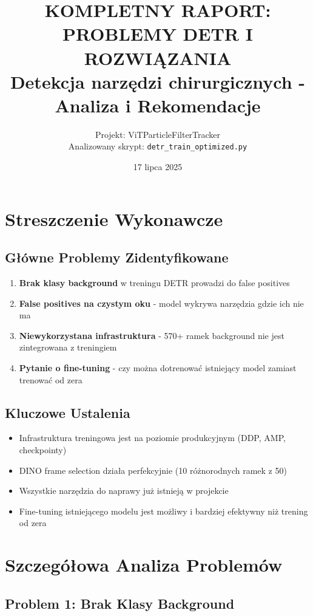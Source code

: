 \documentclass[12pt,a4paper]{article}
\title{\textbf{KOMPLETNY RAPORT: PROBLEMY DETR I ROZWIĄZANIA}\\
\Large Detekcja narzędzi chirurgicznych - Analiza i Rekomendacje}
\author{Projekt: ViTParticleFilterTracker\\
Analizowany skrypt: \texttt{detr\_train\_optimized.py}}
\date{17 lipca 2025}
\begin{document}
\maketitle
\tableofcontents
\newpage

\section{Streszczenie Wykonawcze}

\subsection{Główne Problemy Zidentyfikowane}

\begin{enumerate}
    \item \textbf{Brak klasy background} w treningu DETR prowadzi do false positives
    \item \textbf{False positives na czystym oku} - model wykrywa narzędzia gdzie ich nie ma
    \item \textbf{Niewykorzystana infrastruktura} - 570+ ramek background nie jest zintegrowana z treningiem
    \item \textbf{Pytanie o fine-tuning} - czy można dotrenować istniejący model zamiast trenować od zera
\end{enumerate}

\subsection{Kluczowe Ustalenia}

\begin{itemize}
    \item Infrastruktura treningowa jest na poziomie produkcyjnym (DDP, AMP, checkpointy)
    \item DINO frame selection działa perfekcyjnie (10 różnorodnych ramek z 50)
    \item Wszystkie narzędzia do naprawy już istnieją w projekcie
    \item Fine-tuning istniejącego modelu jest możliwy i bardziej efektywny niż trening od zera
\end{itemize}

\section{Szczegółowa Analiza Problemów}

\subsection{Problem 1: Brak Klasy Background}
\end{document}
